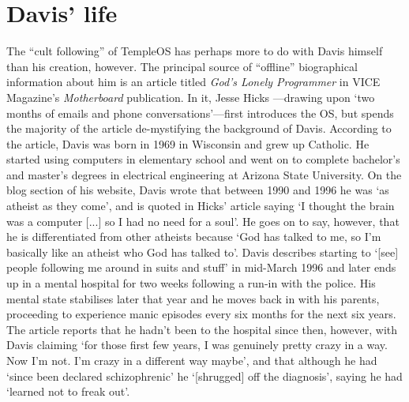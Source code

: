 \documentclass[Draft.tex]{subfiles}
\begin{document}
\section*{Davis' life}
The ``cult following'' of TempleOS has perhaps
more to do with Davis himself than his creation, however.
The principal source of ``offline'' biographical information about him is
an article titled \textit{God’s Lonely Programmer}
in VICE Magazine’s \textit{Motherboard} publication.
In it, Jesse Hicks \parencite*{Hicks14}---drawing
upon `two months of emails and phone conversations'---first
introduces the OS,
but spends the majority of the article de-mystifying the background of Davis.
According to the article,
Davis was born in 1969 in Wisconsin and grew up Catholic.
He started using computers in elementary school
and went on to complete bachelor's and master's degrees
in electrical engineering at Arizona State University.
On the blog section of his website, Davis \parencite*{Atheist} wrote that
between 1990 and 1996 he was `as atheist as they come',
and is quoted in Hicks' article saying
`I thought the brain was a computer [...] so I had no need for a soul'.
He goes on to say, however, that he is differentiated from other atheists
because `God has talked to me,
so I'm basically like an atheist who God has talked to'.
Davis describes starting to
`[see] people following me around in suits and stuff' in mid-March 1996
and later ends up in a mental hospital for two weeks
following a run-in with the police.
His mental state stabilises later that year
and he moves back in with his parents,
proceeding to experience manic episodes every six months for the next six years.
The article reports that he hadn't been to the hospital since then, however,
with Davis claiming
`for those first few years, I was genuinely pretty crazy in a way.
Now I'm not. I'm crazy in a different way maybe',
and that although he had `since been declared schizophrenic' he
`[shrugged] off the diagnosis', saying he had `learned not to freak out'.
\end{document}
